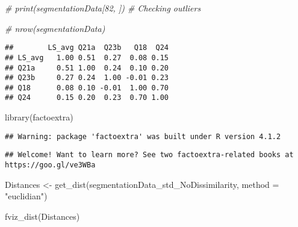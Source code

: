 \documentclass[
]{article}
\newenvironment{Shaded}{\begin{snugshade}}{\end{snugshade}}
\newcommand{\AttributeTok}[1]{\textcolor[rgb]{0.77,0.63,0.00}{#1}}
\newcommand{\CommentTok}[1]{\textcolor[rgb]{0.56,0.35,0.01}{\textit{#1}}}
\newcommand{\ConstantTok}[1]{\textcolor[rgb]{0.00,0.00,0.00}{#1}}
\newcommand{\DecValTok}[1]{\textcolor[rgb]{0.00,0.00,0.81}{#1}}
\newcommand{\FunctionTok}[1]{\textcolor[rgb]{0.00,0.00,0.00}{#1}}
\newcommand{\NormalTok}[1]{#1}
\newcommand{\OtherTok}[1]{\textcolor[rgb]{0.56,0.35,0.01}{#1}}
\newcommand{\SpecialCharTok}[1]{\textcolor[rgb]{0.00,0.00,0.00}{#1}}
\newcommand{\StringTok}[1]{\textcolor[rgb]{0.31,0.60,0.02}{#1}}
\begin{document}
\begin{Shaded}
\begin{Highlighting}[]
\CommentTok{\# print(segmentationData[82, ]) \# Checking outliers}

\CommentTok{\# nrow(segmentationData)}
\end{Highlighting}
\end{Shaded}

\begin{Shaded}
\end{Shaded}

\begin{verbatim}
##        LS_avg Q21a  Q23b   Q18  Q24
## LS_avg   1.00 0.51  0.27  0.08 0.15
## Q21a     0.51 1.00  0.24  0.10 0.20
## Q23b     0.27 0.24  1.00 -0.01 0.23
## Q18      0.08 0.10 -0.01  1.00 0.70
## Q24      0.15 0.20  0.23  0.70 1.00
\end{verbatim}

\begin{Shaded}
\begin{Highlighting}[]
\FunctionTok{library}\NormalTok{(factoextra)}
\end{Highlighting}
\end{Shaded}

\begin{verbatim}
## Warning: package 'factoextra' was built under R version 4.1.2
\end{verbatim}

\begin{verbatim}
## Welcome! Want to learn more? See two factoextra-related books at https://goo.gl/ve3WBa
\end{verbatim}

\begin{Shaded}
\begin{Highlighting}[]
\NormalTok{Distances }\OtherTok{\textless{}{-}} \FunctionTok{get\_dist}\NormalTok{(segmentationData\_std\_NoDissimilarity, }\AttributeTok{method =} \StringTok{"euclidian"}\NormalTok{)}

\FunctionTok{fviz\_dist}\NormalTok{(Distances)}
\end{Highlighting}
\end{Shaded}
\end{document}
